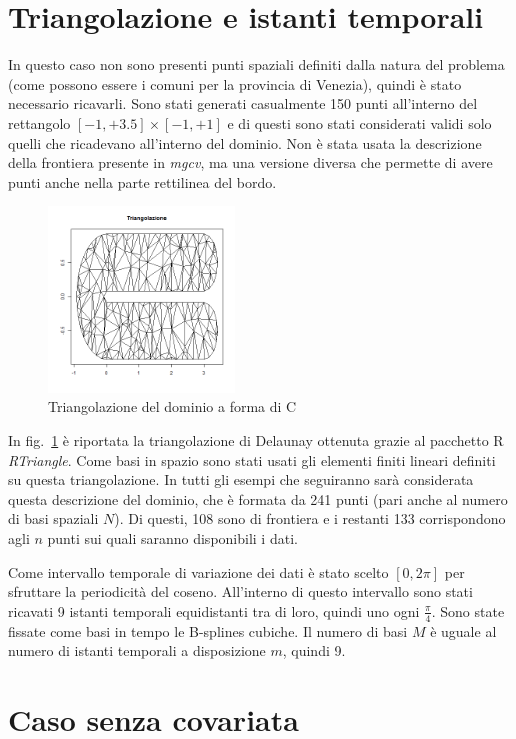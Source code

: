 \documentclass[a4paper,11pt,twoside,openright]{book}							%
\begin{document}
\section{Triangolazione e istanti temporali}
In questo caso non sono presenti punti spaziali definiti dalla natura del problema (come possono essere i comuni per la provincia di Venezia), quindi è stato necessario ricavarli. Sono stati generati casualmente 150 punti all'interno del rettangolo $[-1,+3.5] \times [-1,+1]$ e di questi sono stati considerati validi solo quelli che ricadevano all'interno del dominio. Non è stata usata la descrizione della frontiera presente in \textit{mgcv}, ma una versione diversa che permette di avere punti anche nella parte rettilinea del bordo.
\begin{figure}[t]
	\centering
	\includegraphics[width=0.44\textwidth]{Immagini/DomCinizio/DomC_Triangolazione.png}
	\caption{Triangolazione del dominio a forma di C}
	\label{fig:domC_triang}
\end{figure}
In fig.~\ref{fig:domC_triang} è riportata la triangolazione di Delaunay ottenuta grazie al pacchetto R \textit{RTriangle}. Come basi in spazio sono stati usati gli elementi finiti lineari definiti su questa triangolazione. In tutti gli esempi che seguiranno sarà considerata questa descrizione del dominio, che è formata da 241 punti (pari anche al numero di basi spaziali $N$). Di questi, 108 sono di frontiera e i restanti 133 corrispondono agli $n$ punti sui quali saranno disponibili i dati.

Come intervallo temporale di variazione dei dati è stato scelto $[0,2\pi]$ per sfruttare la periodicità del coseno. All'interno di questo intervallo sono stati ricavati 9 istanti temporali equidistanti tra di loro, quindi uno ogni $\frac{\pi}{4}$. Sono state fissate come basi in tempo le B-splines cubiche. Il numero di basi $M$ è uguale al numero di istanti temporali a disposizione $m$, quindi 9. 
\newpage
\section{Caso senza covariata}
\end{document}
